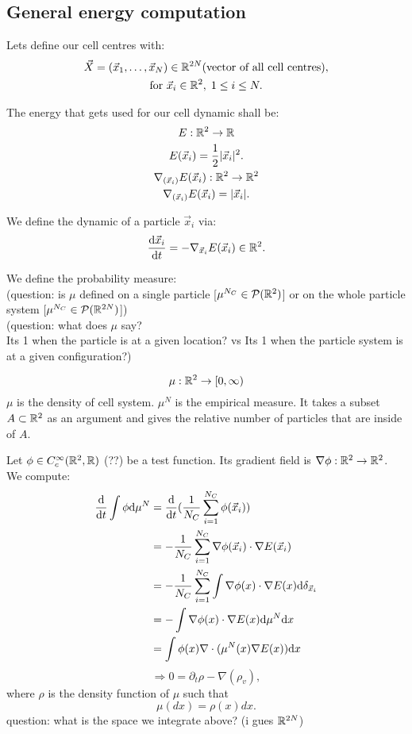 \subsection{General energy computation}

Lets define our cell centres with:
\begin{gather*}
    \vec{X} = (\vec{x}_1, \ldots, \vec{x}_N) \in \mathbb{R}^{2N} \text{(vector of all cell centres)}, \\
    \text{for } \vec{x}_i \in \mathbb{R}^2, \; 1 \leq i \leq N. \\
\end{gather*}

The energy that gets used for our cell dynamic shall be: 
\begin{gather*}
    E: \mathbb{R}^2 \rightarrow \mathbb{R} \\ 
    E(\vec{x}_i) = \frac{1}{2} |\vec{x}_i|^2. \\
    \nabla_{(\vec{x}_i)} E(\vec{x}_i): \mathbb{R}^2 \rightarrow \mathbb{R}^2 \\
    \nabla_{(\vec{x}_i)} E(\vec{x}_i) = |\vec{x}_i| . \\
\end{gather*}

We define the dynamic of a particle $\vec{x}_i$ via: \\
\[ \dfrac{\mathrm{d} \vec{x}_i}{\mathrm{d} t} = - \nabla_{\vec{x}_i} E(\vec{x}_i) \in \mathbb{R}^{2}. \]

We define the probability measure:\\
(question: is $\mu$ defined on a single particle [$\mu^{N_C} \in \mathcal{P}(\mathbb{R}^2)$] or on the whole particle system [$\mu^{N_C} \in \mathcal{P}(\mathbb{R}^{2N})$]) \\
(question: what does $\mu$ say? \\
Its 1 when the particle is at a given location? vs Its 1 when the particle system is at a given configuration?)


\[ \mu: \mathbb{R}^2 \rightarrow [0,\infty)  \]
$\mu$ is the density of cell system.
$\mu^N$ is the empirical measure. 
It takes a subset $A \subset \mathbb{R}^2$ as an argument and gives the relative number of particles that are inside of $A$. 

Let $\phi \in C_c^{\infty}(\mathbb{R}^{2}, \mathbb{R})$ (??) be a test function. 
Its gradient field is $ \nabla \phi : \mathbb{R}^2 \rightarrow \mathbb{R}^2$. 
We compute: 
\begin{align*}
    \frac{\mathrm{d}}{\mathrm{d} t} \int \phi \mathrm{d} \mu^N 
    &= \frac{\mathrm{d}}{\mathrm{d} t} (\frac{1}{N_C} \sum\limits_{i=1}^{N_C} \phi(\vec{x}_i)) \\
    &= - \frac{1}{N_C} \sum\limits_{i=1}^{N_C} \nabla \phi(\vec{x}_i) \cdot \nabla E(\vec{x}_i) \\
    &= - \frac{1}{N_C} \sum\limits_{i=1}^{N_C} \int \nabla \phi(x) \cdot \nabla E(x) \mathrm{d} \delta_{\vec{x}_i} \\
    &= - \int \nabla \phi(x) \cdot \nabla E(x) \mathrm{d} \mu^N \mathrm{d} x \\
    &= \int \phi(x)  \nabla \cdot ( \mu^N(x) \nabla E(x)) \mathrm{d} x \\
\end{align*}
\[ \Rightarrow  0 = \partial_t \rho - \nabla(\rho_v),\]
where $\rho$ is the density function of $\mu$ such that \[ \mu(dx) = \rho(x) dx. \]
question: what is the space we integrate above? (i gues $\mathbb{R}^{2N}$)